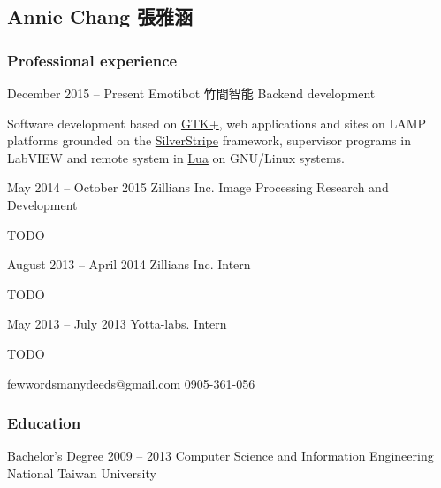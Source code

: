 \documentclass{tccv}
\begin{document}
\begin{CJK*}{UTF8}{bsmi}

\part{Annie Chang 張雅涵}

\section{Professional experience}

\begin{eventlist}

\item{December 2015 -- Present}
     {Emotibot 竹間智能}
     {Backend development}

Software development based on \href{http://www.gtk.org/}{GTK+},
web applications and sites on LAMP platforms grounded on the
\href{http://www.silverstripe.org/}{SilverStripe} framework,
supervisor programs in LabVIEW and remote system in
\href{http://www.lua.org/}{Lua} on GNU/Linux systems.

\item{May 2014 -- October 2015}
     {Zillians Inc.}
     {Image Processing Research and Development}

TODO

\item{August 2013 -- April 2014}
     {Zillians Inc.}
     {Intern}

TODO

\item{May 2013 -- July 2013}
     {Yotta-labs.}
     {Intern}

TODO

\end{eventlist}

\personal
    {fewwordsmanydeeds@gmail.com}
    {0905-361-056}
    {}
    {}

\section{Education}

\begin{yearlist}

\item[Bachelor's Degree]{2009 -- 2013}
     {Computer Science and Information Engineering}
     {National Taiwan University}

\end{yearlist}



\end{CJK*}
\end{document}
